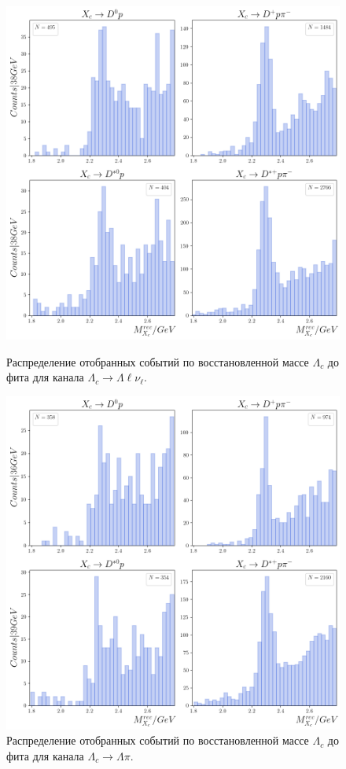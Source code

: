 \begin{figure}[H]
    \centering
    \begin{minipage}[b]{0.48\linewidth}
        \centering
        \includegraphics[width=\linewidth]{img/lc_l_nu.png}
        \caption{Распределение отобранных событий по восстановленной массе $\Lambda_c$ до фита для канала $\Lambda_c \to \Lambda \ell \nu_\ell$.}
    \end{minipage}%
    \hfill
    \begin{minipage}[b]{0.48\linewidth}
        \centering
        \includegraphics[width=\linewidth]{img/lc_pi.png}
        \caption{Распределение отобранных событий по восстановленной массе $\Lambda_c$ до фита для канала $\Lambda_c \to \Lambda \pi$.}
    \end{minipage}
\end{figure}



